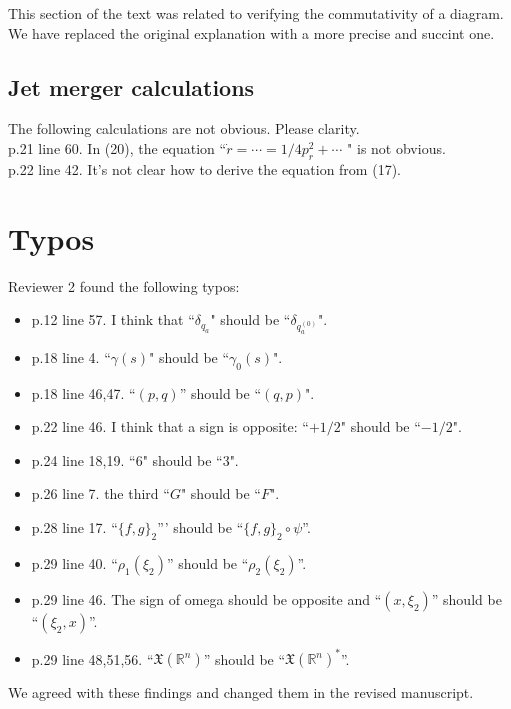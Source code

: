 \documentclass{article}
\begin{document}
This section of the text was related to verifying the commutativity of a diagram.  We have replaced the original explanation with a more precise and succint one.

\subsection{Jet merger calculations}
The following calculations are not obvious. Please clarity. 
\\
p.21 line 60. In (20), the equation ``$\dot{r} = \cdots = 1/4 p_r^2 + \cdots$ " is not obvious. 
\\
p.22 line 42. It's not clear how to derive the equation from (17). 
\\

\section{Typos}
Reviewer 2 found the following typos:
\begin{itemize}
 \item p.12 line 57. I think that ``$\delta_{q_a}$" should be ``$\delta_{q_a^{(0)}}$". 
\item p.18 line 4. ``$\gamma(s)$" should be ``$\gamma_0(s)$". 
\item p.18 line 46,47. ``$(p, q)$'' should be ``$(q, p)$". 
\item p.22 line 46. I think that a sign is opposite: ``$+ 1/2$" should be ``$-1/2$". 
\item p.24 line 18,19. ``$6$" should be ``$3$". 
\item p.26 line 7. the third ``$G$" should be ``$F$".  
\item p.28 line 17. ``$\{f, g \}_2$''' should be ``$\{f, g \}_2 \circ \psi$''. 
\item p.29 line 40. ``$\rho_1(\xi_2)$'' should be ``$\rho_2(\xi_2)$''. 
\item p.29 line 46. The sign of omega should be opposite and ``$(x, \xi_2)$'' 
should be ``$(\xi_2, x)$''. 
\\
\item p.29 line 48,51,56. 
``$\mathfrak{X}(\mathbb{R}^n)$'' should be 
``$\mathfrak{X}(\mathbb{R}^n)^*$''. 
\end{itemize}

We agreed with these findings and changed them in the revised manuscript.
\end{document}
